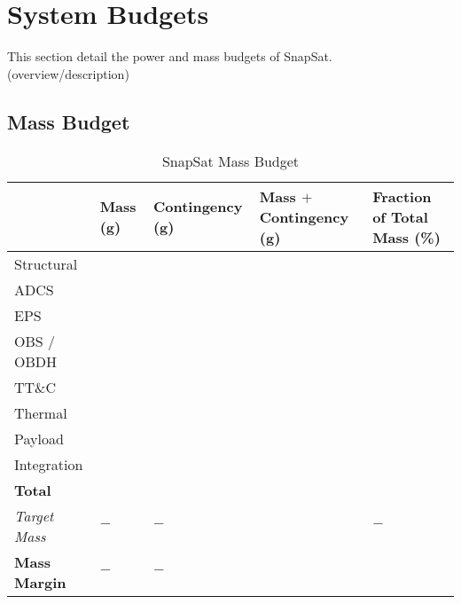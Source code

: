 \section{System Budgets}
This section detail the power and mass budgets of SnapSat. (overview/description)

\subsection{Mass Budget}
\vspace{-0.3cm}
\begin{table}[H]
    \centering
    \caption{SnapSat Mass Budget}
    \vspace{0.15cm}
    \label{tab:designoverview}
    {\renewcommand{\arraystretch}{1.4}%
    \begin{tabular}{|>{\arraybackslash}m{2.6cm}||>{\arraybackslash}m{2.5cm}|>{\arraybackslash}m{2.5cm}|>{\arraybackslash}m{3cm}|>{\arraybackslash}m{3cm}|}
            \hline
            {\bf Subsystem} & {\bf Mass (g)} & {\bf Contingency (g)} & {\bf Mass $+$ Contingency (g)} & {\bf Fraction of Total Mass (\%)} \\ \hline\hline
            Structural &  &  &  &  \\ \hline
            ADCS &  &  &  &  \\ \hline
            EPS &  &  &  &  \\ \hline
            OBS / OBDH &  &  &  &  \\ \hline
            TT\&C &  &  &  &  \\ \hline
            Thermal &  &  &  &  \\ \hline
            Payload &  &  &  &  \\ \hline
            Integration &  &  &  &  \\ \hline\hline
            \textbf{Total} &  &  &  &  \\ \hline
            \textit{Target Mass} & $-$ & $-$ &  & $-$ \\ \hline
            \textbf{Mass Margin} & $-$ & $-$ &  &  \\ \hline
    \end{tabular} } 
\end{table} \vspace{0.3cm}


